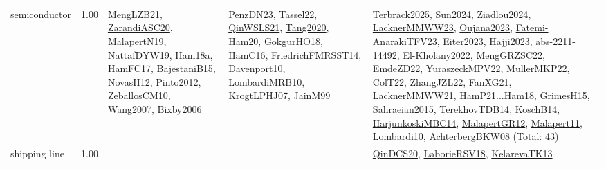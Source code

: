 {\begin{longtable}{p{3cm}r>{\raggedright\arraybackslash}p{6cm}>{\raggedright\arraybackslash}p{6cm}>{\raggedright\arraybackslash}p{8cm}}
\index{semiconductor}\index{ApplicationAreas!semiconductor}semiconductor &  1.00 & \hyperref[detail:MengLZB21]{MengLZB21}, \hyperref[detail:ZarandiASC20]{ZarandiASC20}, \hyperref[detail:MalapertN19]{MalapertN19}, \hyperref[detail:NattafDYW19]{NattafDYW19}, \hyperref[detail:Ham18a]{Ham18a}, \hyperref[detail:HamFC17]{HamFC17}, \hyperref[detail:BajestaniB15]{BajestaniB15}, \hyperref[detail:NovasH12]{NovasH12}, \hyperref[detail:Pinto2012]{Pinto2012}, \hyperref[detail:ZeballosCM10]{ZeballosCM10}, \hyperref[detail:Wang2007]{Wang2007}, \hyperref[detail:Bixby2006]{Bixby2006} & \hyperref[detail:PenzDN23]{PenzDN23}, \hyperref[detail:Tassel22]{Tassel22}, \hyperref[detail:QinWSLS21]{QinWSLS21}, \hyperref[detail:Tang2020]{Tang2020}, \hyperref[detail:Ham20]{Ham20}, \hyperref[detail:GokgurHO18]{GokgurHO18}, \hyperref[detail:HamC16]{HamC16}, \hyperref[detail:FriedrichFMRSST14]{FriedrichFMRSST14}, \hyperref[detail:Davenport10]{Davenport10}, \hyperref[detail:LombardiMRB10]{LombardiMRB10}, \hyperref[detail:KrogtLPHJ07]{KrogtLPHJ07}, \hyperref[detail:JainM99]{JainM99} & \hyperref[detail:Terbrack2025]{Terbrack2025}, \hyperref[detail:Sun2024]{Sun2024}, \hyperref[detail:Ziadlou2024]{Ziadlou2024}, \hyperref[detail:LacknerMMWW23]{LacknerMMWW23}, \hyperref[detail:Oujana2023]{Oujana2023}, \hyperref[detail:Fatemi-AnarakiTFV23]{Fatemi-AnarakiTFV23}, \hyperref[detail:Eiter2023]{Eiter2023}, \hyperref[detail:Hajji2023]{Hajji2023}, \hyperref[detail:abs-2211-14492]{abs-2211-14492}, \hyperref[detail:El-Kholany2022]{El-Kholany2022}, \hyperref[detail:MengGRZSC22]{MengGRZSC22}, \hyperref[detail:EmdeZD22]{EmdeZD22}, \hyperref[detail:YuraszeckMPV22]{YuraszeckMPV22}, \hyperref[detail:MullerMKP22]{MullerMKP22}, \hyperref[detail:ColT22]{ColT22}, \hyperref[detail:ZhangJZL22]{ZhangJZL22}, \hyperref[detail:FanXG21]{FanXG21}, \hyperref[detail:LacknerMMWW21]{LacknerMMWW21}, \hyperref[detail:HamP21]{HamP21}...\hyperref[detail:Ham18]{Ham18}, \hyperref[detail:GrimesH15]{GrimesH15}, \hyperref[detail:Sahraeian2015]{Sahraeian2015}, \hyperref[detail:TerekhovTDB14]{TerekhovTDB14}, \hyperref[detail:KoschB14]{KoschB14}, \hyperref[detail:HarjunkoskiMBC14]{HarjunkoskiMBC14}, \hyperref[detail:MalapertGR12]{MalapertGR12}, \hyperref[detail:Malapert11]{Malapert11}, \hyperref[detail:Lombardi10]{Lombardi10}, \hyperref[detail:AchterbergBKW08]{AchterbergBKW08} (Total: 43)\\
\index{shipping line}\index{ApplicationAreas!shipping line}shipping line &  1.00 &  &  & \hyperref[detail:QinDCS20]{QinDCS20}, \hyperref[detail:LaborieRSV18]{LaborieRSV18}, \hyperref[detail:KelarevaTK13]{KelarevaTK13}\\

\end{longtable}}
